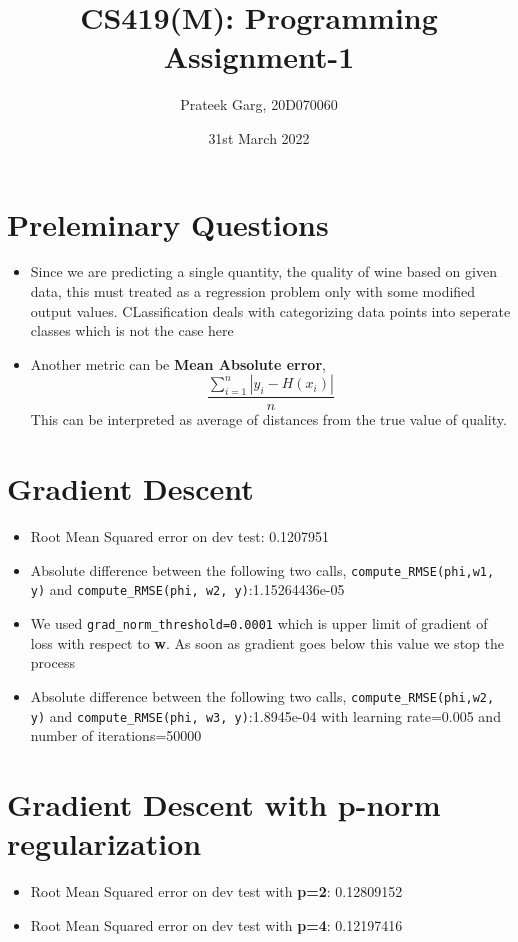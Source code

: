 \documentclass[12pt]{article}
\title{CS419(M): Programming Assignment-1}
\author{Prateek Garg, 20D070060}
\date{31st March 2022}
\begin{document}
\noindent
\maketitle
\section{Preleminary Questions}
\begin{itemize}
    \item Since we are predicting a single quantity, the quality of wine based on given data,
    this must treated as a regression problem only with some modified output values. 
    CLassification deals with categorizing data points into seperate classes which is not the case here
    \item Another metric can be \textbf{Mean Absolute error}, $$\frac{\sum_{i=1}^{n} |y_i-H(x_i)|}{n}$$ 
    This can be interpreted as average of distances from the true value of quality.
\end{itemize}

\section{Gradient Descent}
\begin{itemize}
    \item Root Mean Squared error on dev test: 0.1207951
    \item Absolute difference between the following two calls,
    \texttt{compute\_RMSE(phi,w1, y)} and \texttt{compute\_RMSE(phi, w2, y)}:1.15264436e-05
    \item We used \texttt{grad\_norm\_threshold=0.0001} which is upper limit of gradient of loss with respect to \textbf{w}.
     As soon as gradient goes below this value we stop the process
    \item Absolute difference between the following two calls, 
    \texttt{compute\_RMSE(phi,w2, y)} and \texttt{compute\_RMSE(phi, w3, y)}:1.8945e-04
    with learning rate=0.005 and number of iterations=50000
\end{itemize}

\section{Gradient Descent with p-norm regularization}
\begin{itemize}
    \item Root Mean Squared error on dev test with \textbf{p=2}: 0.12809152
    \item Root Mean Squared error on dev test with \textbf{p=4}: 0.12197416
\end{itemize}
\end{document}
